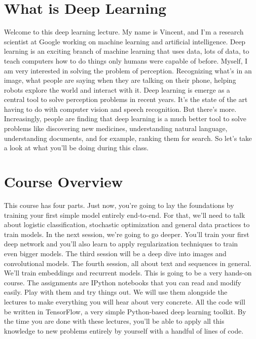 \documentclass{article}
\begin{document}
\section{What is Deep Learning}
Welcome to this deep learning lecture.
My name is Vincent, and I'm a research
scientist at Google working on machine
learning and artificial intelligence.
Deep learning is an exciting branch
of machine learning that uses data,
lots of data,
to teach computers how to do things
only humans were capable of before.
Myself, I am very interested in
solving the problem of perception.
Recognizing what's in an image, what
people are saying when they are talking
on their phone, helping robots explore
the world and interact with it.
Deep learning is emerge as a central
tool to solve perception problems
in recent years.
It's the state of the art having
to do with computer vision and
speech recognition.
But there's more.
Increasingly, people are finding
that deep learning is a much better
tool to solve problems like discovering
new medicines, understanding natural
language, understanding documents, and
for example, ranking them for search.
So let's take a look at what
you'll be doing during this class.
\section{Course Overview}
This course has four parts.
Just now, you're going to lay
the foundations by training your first
simple model entirely end-to-end.
For that, we'll need to talk
about logistic classification,
stochastic optimization and
general data practices to train models.
In the next session,
we're going to go deeper.
You'll train your first deep network and
you'll also learn to
apply regularization techniques
to train even bigger models.
The third session will be a deep dive
into images and convolutional models.
The fourth session, all about text and
sequences in general.
We'll train embeddings and
recurrent models.
This is going to be
a very hands-on course.
The assignments are IPython notebooks
that you can read and modify easily.
Play with them and try things out.
We will use them alongside the lectures
to make everything you will
hear about very concrete.
All the code will be
written in TensorFlow,
a very simple Python-based
deep learning toolkit.
By the time you are done
with these lectures,
you'll be able to apply all
this knowledge to new problems
entirely by yourself with
a handful of lines of code.
\end{document}
